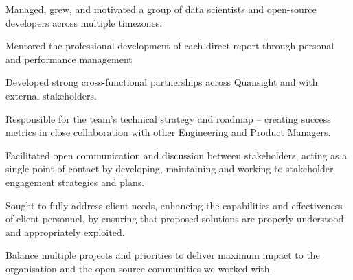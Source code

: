\begin{cventries}
{\begin{cvitems}
    \item{Managed, grew, and motivated a group of data scientists and open-source developers across multiple timezones.}
    \item {Mentored the professional development of each direct report through personal and performance management}
    \item {Developed strong cross-functional partnerships across Quansight and with external stakeholders.}
    \item {Responsible for the team's technical strategy and roadmap – creating success metrics in close collaboration with other Engineering and Product Managers.}
    \item {Facilitated open communication and discussion between stakeholders, acting as a single point of contact by developing, maintaining and working to stakeholder engagement strategies and plans.}
    \item {Sought to fully address client needs, enhancing the capabilities and effectiveness of client personnel, by ensuring that proposed solutions are properly understood and appropriately exploited.}
    \item {Balance multiple projects and priorities to deliver maximum impact to the organisation and the open-source communities we worked with.}
\end{cvitems}
}


\end{cventries}
